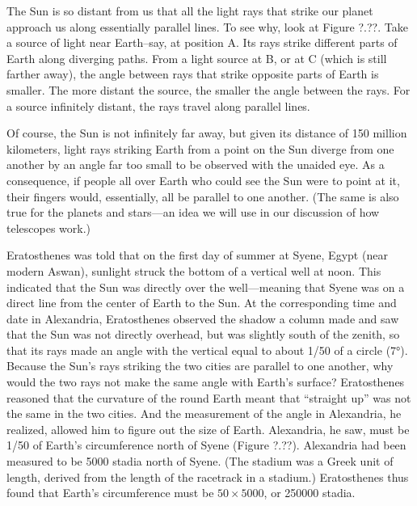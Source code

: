 \documentclass[../../main-astronomy.tex]{subfiles}
\begin{document}
\vspace{1em}

The Sun is so distant from us that all the light rays that strike our planet approach us along essentially parallel lines. To see why, look at Figure ?.??. Take a source of light near Earth--say, at position A. Its rays strike different parts of Earth along diverging paths. From a light source at B, or at C (which is still farther away), the angle between rays that strike opposite parts of Earth is smaller. The more distant the source, the smaller the angle between the rays. For a source infinitely distant, the rays travel along parallel lines.


\vspace{1em}

Of course, the Sun is not infinitely far away, but given its distance of 150 million kilometers, light rays striking Earth from a point on the Sun diverge from one another by an angle far too small to be observed with the unaided eye. As a consequence, if people all over Earth who could see the Sun were to point at it, their fingers would, essentially, all be parallel to one another. (The same is also true for the planets and stars---an idea we will use in our discussion of how telescopes work.)

\vspace{1em}

Eratosthenes was told that on the first day of summer at Syene, Egypt (near modern Aswan), sunlight struck the bottom of a vertical well at noon. This indicated that the Sun was directly over the well---meaning that Syene was on a direct line from the center of Earth to the Sun. At the corresponding time and date in Alexandria, Eratosthenes observed the shadow a column made and saw that the Sun was not directly overhead, but was slightly south of the zenith, so that its rays made an angle with the vertical equal to about 1/50 of a circle (\ang{7}). Because the Sun's rays striking the two cities are parallel to one another, why would the two rays not make the same angle with Earth's surface? Eratosthenes reasoned that the curvature of the round Earth meant that ``straight up'' was not the same in the two cities. And the measurement of the angle in Alexandria, he realized, allowed him to figure out the size of Earth. Alexandria, he saw, must be 1/50 of Earth's circumference north of Syene (Figure ?.??). Alexandria had been measured to be 5000 stadia north of Syene. (The stadium was a Greek unit of length, derived from the length of the racetrack in a stadium.) Eratosthenes thus found that Earth's circumference must be $50 \times 5000$, or \num{250000} stadia.
\end{document}
